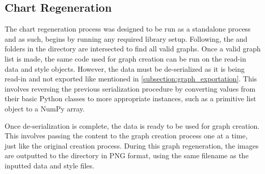 \subsection{Chart Regeneration}
\label{subsection:chart_regeneration}
The chart regeneration process was designed to be run as a standalone process and as such, begins by running any required library setup. Following, the  and  folders in the  directory are intersected to find all valid graphs. Once a valid graph list is made, the same code used for graph creation can be run on the read-in data and style objects. However, the data must be de-serialized as it is being read-in and not exported like mentioned in \autoref{subsection:graph_exportation}. This involves reversing the previous serialization procedure by converting values from their basic Python classes to more appropriate instances, such as a primitive list object to a NumPy array.

\hfill

Once de-serialization is complete, the data is ready to be used for graph creation. This involves passing the content to the graph creation process one at a time, just like the original creation process. During this graph regeneration, the images are outputted to the  directory in PNG format, using the same filename as the inputted data and style files.

